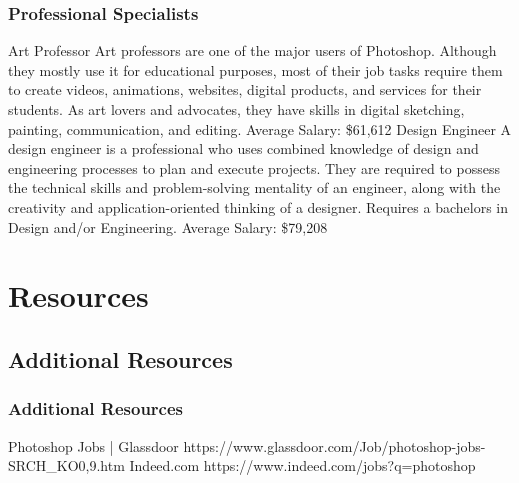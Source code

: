 \documentclass{beamer}
\begin{document}
	\begin{frame}
	\frametitle{Professional Specialists}
	\begin{outline}
		\1 Art Professor 
		\2 Art professors are one of the major users of Photoshop. Although they mostly use it for educational purposes, most of their job tasks require them to create videos, animations, websites, digital products, and services for their students. As art lovers and advocates, they have skills in digital sketching, painting, communication, and editing. 
		\2 Average Salary:  \$61,612
		\1 Design Engineer
		\2 A design engineer is a professional who uses combined knowledge of design and engineering processes to plan and execute projects. They are required to possess the technical skills and problem-solving mentality of an engineer, along with the creativity and application-oriented thinking of a designer.  Requires a bachelors in Design and/or Engineering.  
		\2 Average Salary:  \$79,208
	\end{outline}
\end{frame}


\section{Resources}

\subsection{Additional Resources}		
	\begin{frame}
		\frametitle{Additional Resources}
		\begin{outline}
			\1 Photoshop Jobs | Glassdoor
			\2 https://www.glassdoor.com/Job/photoshop-jobs-SRCH\_KO0,9.htm
			\1 Indeed.com
			\2 https://www.indeed.com/jobs?q=photoshop
		\end{outline}
	\end{frame}

	
\end{document}
